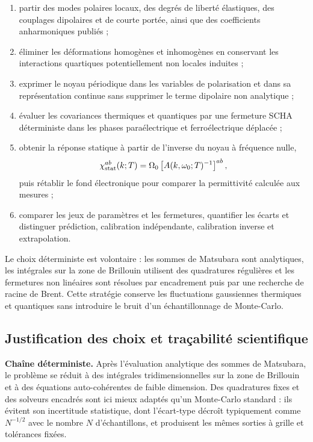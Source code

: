 \documentclass{rapportCS}
\begin{document}
\begin{enumerate}[label=\textbf{M\arabic*.},leftmargin=2.7em,itemsep=3pt]
  \item partir des modes polaires locaux, des degrés de liberté élastiques, des
  couplages dipolaires et de courte portée, ainsi que des coefficients
  anharmoniques publiés ;
  \item éliminer les déformations homogènes et inhomogènes en conservant les
  interactions quartiques potentiellement non locales induites ;
  \item exprimer le noyau périodique dans les variables de polarisation et dans
  sa représentation continue sans supprimer le terme dipolaire non analytique ;
  \item évaluer les covariances thermiques et quantiques par une fermeture SCHA
  déterministe dans les phases paraélectrique et ferroélectrique déplacée ;
  \item obtenir la réponse statique à partir de l'inverse du noyau à fréquence
  nulle,
  \begin{equation}
  \chi^{ab}_{\rm stat}(k;T)
  =\Omega_0\left[A(k,\omega_0;T)^{-1}\right]^{ab},
  \label{eq:cs_static_susceptibility}
  \end{equation}
  puis rétablir le fond électronique pour comparer la permittivité calculée aux
  mesures ;
  \item comparer les jeux de paramètres et les fermetures, quantifier les
  écarts et distinguer prédiction, calibration indépendante, calibration
  inverse et extrapolation.
\end{enumerate}

Le choix déterministe est volontaire : les sommes de Matsubara sont analytiques,
les intégrales sur la zone de Brillouin utilisent des
quadratures régulières et les fermetures non linéaires sont résolues par
encadrement puis par une recherche de racine de Brent. Cette stratégie conserve les fluctuations
gaussiennes thermiques et quantiques sans introduire le bruit d'un
échantillonnage de Monte-Carlo.

\subsection{Justification des choix et traçabilité scientifique}

\noindent\textbf{Chaîne déterministe.} Après l'évaluation analytique des sommes
de Matsubara, le problème se réduit à des intégrales tridimensionnelles sur la
zone de Brillouin et à des équations auto-cohérentes de faible dimension. Des
quadratures fixes et des solveurs encadrés sont ici mieux adaptés qu'un
Monte-Carlo standard : ils évitent son incertitude statistique, dont
l'écart-type décroît typiquement comme $N^{-1/2}$ avec le nombre $N$
d'échantillons, et produisent les mêmes sorties à grille et tolérances fixées.
\end{document}

